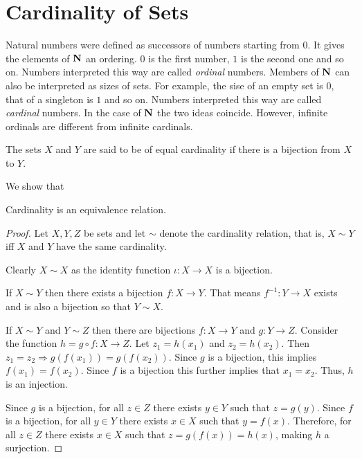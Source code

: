 \section{Cardinality of Sets}\label{c2s6}
Natural numbers were defined as successors of numbers starting from $0$. It
gives the elements of $\mathbf{N}$ an ordering. $0$ is the first number, $1$ is 
the second one and so on. Numbers interpreted this way are called 
\emph{ordinal} numbers. Members of $\mathbf{N}$ can also be interpreted as sizes 
of sets. For example, the sise of an empty set is $0$, that of a singleton 
is $1$ and so on.  Numbers interpreted this way are called \emph{cardinal} 
numbers. In the case of $\mathbf{N}$ the two ideas coincide. However, infinite 
ordinals are different from infinite cardinals.

\begin{defn}\label{c2s6d1}
The sets $X$ and $Y$ are said to be of equal cardinality if there is a 
bijection from $X$ to $Y$.
\end{defn}

We show that
\begin{prop}\label{c2s6p1}
Cardinality is an equivalence relation.
\end{prop}
\begin{proof}
Let $X, Y, Z$ be sets and let $\sim$ denote the cardinality relation, that 
is, $X \sim Y$ iff $X$ and $Y$ have the same cardinality.

Clearly $X \sim X$ as the identity function $\iota: X \rightarrow X$ is a 
bijection.

If $X \sim Y$ then there exists a bijection $f: X \rightarrow Y$. That 
means $f^{-1}: Y \rightarrow X$ exists and is also a bijection so that $Y 
\sim X$.  

If $X \sim Y$ and $Y \sim Z$ then there are bijections $f: X 
\rightarrow Y$ and $g: Y \rightarrow Z$. Consider the function $h = g 
\circ f:X \rightarrow Z$.  Let $z_1 = h(x_1)$ and $z_2 = h(x_2)$. Then 
$z_1 = z_2 \Rightarrow g(f(x_1)) = g(f(x_2))$. Since $g$ is a bijection, 
this implies $f(x_1) = f(x_2)$. Since $f$ is a bijection this further 
implies that $x_1 = x_2$. Thus, $h$ is an injection.

Since $g$ is a bijection, for all $z \in Z$ there exists $y \in Y$ such 
that $z = g(y)$. Since $f$ is a bijection, for all $y \in Y$ there exists
$x \in X$ such that $y = f(x)$. Therefore, for all $z \in Z$ there exists 
$x \in X$ such that $z = g(f(x)) = h(x)$, making $h$ a surjection.
\end{proof}

